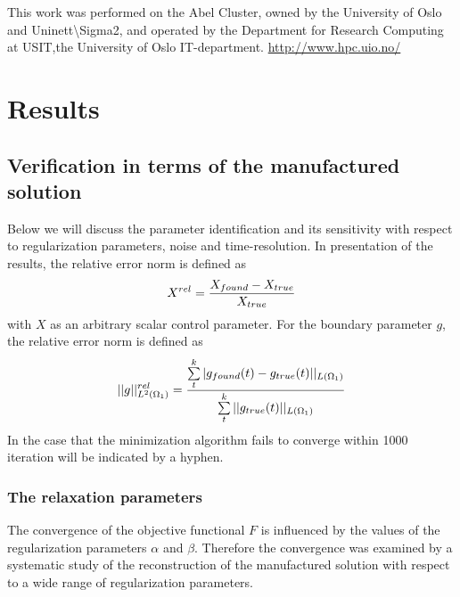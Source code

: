 \documentclass[11pt,a4paper]{article}
\begin{document}
This work was performed on the Abel Cluster, owned by the University of Oslo and Uninett\textbackslash Sigma2, and operated by the Department for Research Computing at USIT,the University of Oslo IT-department. \url{http://www.hpc.uio.no/} 


\section{Results}

\subsection{Verification in terms of the manufactured solution}

Below we will discuss the parameter identification and its sensitivity with respect to regularization parameters, noise and time-resolution. In presentation of the results, the relative error norm is defined as 
\begin{equation}
 X\sp{rel} = \frac{X_{found} -X_{true} }{ X_{true} }
\end{equation}
with $X$ as an arbitrary scalar control parameter. For the boundary parameter $g$, the relative error norm is defined as 
\begin{equation}
|| g ||\sp{rel}_{L\sp{2}(\Omega_1)} = \frac{ \sum\limits_t\sp{k}| g_{found}(t) -g_{true}(t)||_{L(\Omega_1)} }{  \sum\limits_t\sp{k}||g_{true}(t)||_{L(\Omega_1)} }
\end{equation}
In the case that the minimization algorithm fails to converge within 1000 iteration will be indicated by a hyphen.  

\subsubsection{The relaxation parameters}

The convergence of the objective functional $F$ is influenced by the values of the regularization parameters $\alpha$ and $\beta$. Therefore the convergence was examined by a systematic study of the reconstruction of the manufactured solution with respect to a wide range of regularization parameters. 

\end{document}
